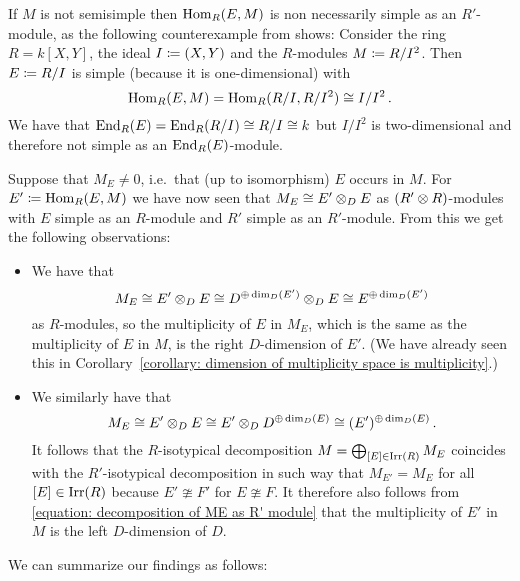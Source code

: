 \begin{warning}
  If $M$ is not semisimple then $\operatorname{Hom}_R(E,M)$ is non necessarily simple as an $R'$-module, as the following counterexample from \cite{MS2859823} shows:
  Consider the ring $R = k[X,Y]$, the ideal $I \coloneqq (X,Y)$ and the $R$-modules $M \coloneqq R/I^2$.
  Then $E \coloneqq R/I$ is simple (because it is one-dimensional) with
  \[
          \operatorname{Hom}_R(E,M)
    =     \operatorname{Hom}_R(R/I, R/I^2)
    \cong I/I^2 \,.
  \]
  We have that $\operatorname{End}_R(E) = \operatorname{End}_R(R/I) \cong R/I \cong k$ but $I/I^2$ is two-dimensional and therefore not simple as an $\operatorname{End}_R(E)$-module.
\end{warning}




\begin{fluff}
  Suppose that $M_E \neq 0$, i.e.\ that (up to isomorphism) $E$ occurs in $M$.
  For $E' \coloneqq \operatorname{Hom}_R(E,M)$ we have now seen that $M_E \cong E' \mathbin{\otimes}_D E$ as $(R' \mathbin{\otimes} R)$-modules with $E$ simple as an $R$-module and $R'$ simple as an $R'$-module.
  From this we get the following observations:
  \begin{itemize}
    \item
      We have that
      \[
              M_E
        \cong E' \mathbin{\otimes}_D E
        \cong D^{\oplus \dim_D(E')} \mathbin{\otimes}_D E
        \cong E^{\oplus \dim_D(E')}
      \]
      as $R$-modules, so the multiplicity of $E$ in $M_E$, which is the same as the multiplicity of $E$ in $M$, is the right $D$-dimension of $E'$.
      (We have already seen this in Corollary~\ref{corollary: dimension of multiplicity space is multiplicity}.)
    \item
      We similarly have that
      \begin{equation}
        \label{equation: decomposition of ME as R' module}
              M_E
        \cong E' \mathbin{\otimes}_D E
        \cong E' \mathbin{\otimes}_D D^{\oplus \dim_D(E)}
        \cong (E')^{\oplus \dim_D(E)} \,.
      \end{equation}
      It follows that the $R$-isotypical decomposition $M = \bigoplus_{[E] \in \operatorname{Irr}(R)} M_E$ coincides with the $R'$-isotypical decomposition in such way that $M_{E'} = M_E$ for all $[E] \in \operatorname{Irr}(R)$ because $E' \ncong F'$ for $E \ncong F$.
      It therefore also follows from \eqref{equation: decomposition of ME as R' module} that the multiplicity of $E'$ in $M$ is the left $D$-dimension of $D$.
  \end{itemize}
  We can summarize our findings as follows:
\end{fluff}



